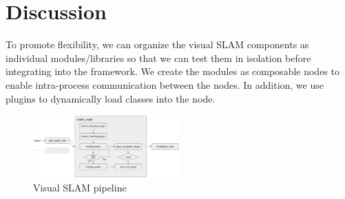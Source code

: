 \section{Discussion}
To promote flexibility, we can organize the visual SLAM components as individual modules/libraries so that we can test them in isolation before integrating into the framework. 
We create the modules as composable nodes to enable intra-process communication between the nodes. 
In addition, we use plugins to dynamically load classes into the node.

\begin{figure}[h]
    \centering
    \includegraphics[width=0.5\textwidth]{img/pipeline.png}
    \caption{Visual SLAM pipeline}
    \label{fig:vslam_pipeline}
\end{figure}

